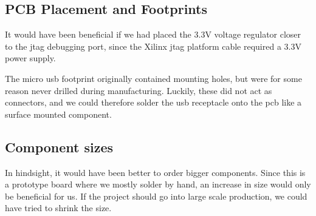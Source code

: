 \subsection{PCB Placement and Footprints}
It would have been beneficial if we had placed the 3.3V voltage regulator closer to the \gls{jtag} debugging port, since the Xilinx \gls{jtag} platform cable required a 3.3V power supply.

The micro \gls{usb} footprint originally contained mounting holes, but were for some reason never drilled during manufacturing. Luckily, these did not act as connectors, and we could therefore solder the \gls{usb} receptacle onto the \gls{pcb} like a surface mounted component.

\subsection{Component sizes}
In hindsight, it would have been better to order bigger components. Since this is a prototype board where we mostly solder by hand, an increase in size would only be beneficial for us. If the project should go into large scale production, we could have tried to shrink the size.